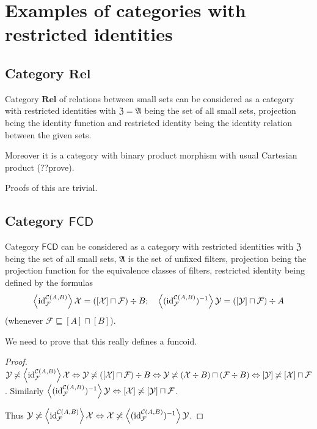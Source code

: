 \section{Examples of categories with restricted identities}

\subsection{\texorpdfstring{Category $\mathbf{Rel}$}{Category Rel}}

Category $\mathbf{Rel}$ of relations between small sets
can be considered as a category with restricted identities
with $\mathfrak{Z}=\mathfrak{A}$ being the set of all
small sets, projection being the identity function and
restricted identity being the identity relation between the
given sets.

Moreover it is a category with binary product morphism
with usual Cartesian product (??prove).

Proofs of this are trivial.

\subsection{\texorpdfstring{Category $\mathsf{FCD}$}{Category FCD}}


Category $\mathsf{FCD}$
can be considered as a category with restricted identities
with $\mathfrak{Z}$ being the set of all
small sets, $\mathfrak{A}$ is the set of unfixed filters,
projection being the projection function for the
equivalence classes of filters,
restricted identity being defined by the formulas
\[
\left\langle \operatorname{id}_\mathcal{F}^{\mathcal{C}(A,B)}\right\rangle\mathcal{X}=
([\mathcal{X}]\sqcap\mathcal{F})\div B;
\quad
\left\langle (\operatorname{id}_\mathcal{F}^{\mathcal{C}(A,B)})^{-1}\right\rangle\mathcal{Y}=
([\mathcal{Y}]\sqcap\mathcal{F})\div A
\]
(whenever $\mathcal{F}\sqsubseteq[A]\sqcap[B]$).

We need to prove that this really defines a funcoid.

\begin{proof}
$\mathcal{Y}\not\asymp
\left\langle \operatorname{id}_\mathcal{F}^{\mathcal{C}(A,B)}\right\rangle\mathcal{X}
\Leftrightarrow
\mathcal{Y}\not\asymp([\mathcal{X}]\sqcap\mathcal{F})\div B
\Leftrightarrow
\mathcal{Y}\not\asymp(\mathcal{X}\div B)\sqcap
(\mathcal{F}\div B) \Leftrightarrow
[\mathcal{Y}]\not\asymp[\mathcal{X}]\sqcap\mathcal{F}$.
Similarly
$\left\langle (\operatorname{id}_\mathcal{F}^{\mathcal{C}(A,B)})^{-1}\right\rangle\mathcal{Y}\Leftrightarrow
[\mathcal{X}]\not\asymp[\mathcal{Y}]\sqcap\mathcal{F}$.

Thus
$\mathcal{Y}\not\asymp
\left\langle \operatorname{id}_\mathcal{F}^{\mathcal{C}(A,B)}\right\rangle\mathcal{X}
\Leftrightarrow
\mathcal{X}\not\asymp
\left\langle (\operatorname{id}_\mathcal{F}^{\mathcal{C}(A,B)})^{-1}\right\rangle\mathcal{Y}$.
\end{proof}

